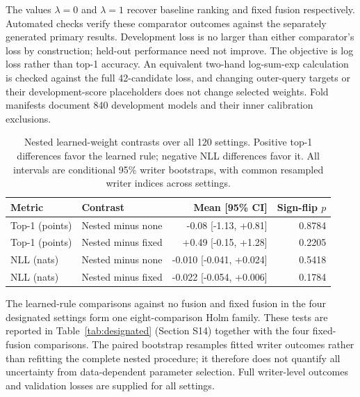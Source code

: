 \documentclass[10pt,a4paper]{article}
\begin{document}
The values $\lambda=0$ and $\lambda=1$ recover baseline ranking and fixed fusion respectively. Automated checks verify these comparator outcomes against the separately generated primary results. Development loss is no larger than either comparator's loss by construction; held-out performance need not improve. The objective is log loss rather than top-1 accuracy. An equivalent two-hand log-sum-exp calculation is checked against the full 42-candidate loss, and changing outer-query targets or their development-score placeholders does not change selected weights. Fold manifests document 840 development models and their inner calibration exclusions.

\begin{table}[ht]
\centering\small
\caption{Nested learned-weight contrasts over all 120 settings. Positive top-1 differences favor the learned rule; negative NLL differences favor it. All intervals are conditional 95\% writer bootstraps, with common resampled writer indices across settings.}
\begin{tabular}{llrr}\toprule
Metric & Contrast & Mean [95\% CI] & Sign-flip $p$\\\midrule
Top-1 (points) & Nested minus none & -0.08 [-1.13, +0.81] & 0.8784 \\
Top-1 (points) & Nested minus fixed & +0.49 [-0.15, +1.28] & 0.2205 \\
NLL (nats) & Nested minus none & -0.010 [-0.041, +0.024] & 0.5418 \\
NLL (nats) & Nested minus fixed & -0.022 [-0.054, +0.006] & 0.1784 \\
\bottomrule

\end{tabular}
\end{table}

The learned-rule comparisons against no fusion and fixed fusion in the four designated settings form one eight-comparison Holm family. These tests are reported in Table~\ref{tab:designated} (Section S14) together with the four fixed-fusion comparisons. The paired bootstrap resamples fitted writer outcomes rather than refitting the complete nested procedure; it therefore does not quantify all uncertainty from data-dependent parameter selection. Full writer-level outcomes and validation losses are supplied for all settings.
\end{document}

